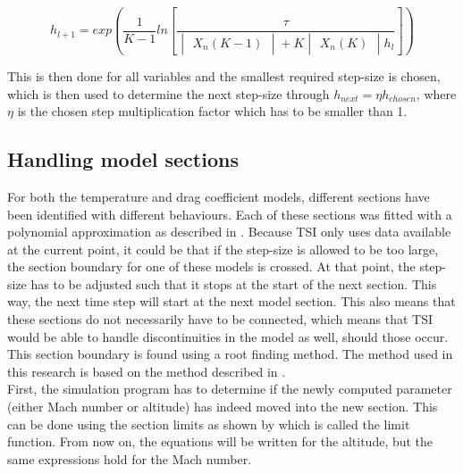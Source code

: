 \begin{equation} \label{eq:fix_point_it}
h_{l+1}=exp\left(\dfrac{1}{K-1}ln\left[\dfrac{\tau}{\begin{vmatrix}
X_{n}\left(K-1\right)
\end{vmatrix}+K\begin{vmatrix}
X_{n}\left(K\right)
\end{vmatrix}h_{l}}\right]\right)
\end{equation}

This is then done for all variables and the smallest required step-size is chosen, which is then used to determine the next step-size through $h_{next}=\eta h_{chosen}$, where $\eta$ is the chosen step multiplication factor which has to be smaller than 1. 


\subsection{Handling model sections}
\label{subsec:handlingModelSections}
For both the temperature and drag coefficient models, different sections have been identified with different behaviours. Each of these sections was fitted with a polynomial approximation as described in . Because \ac{TSI} only uses data available at the current point, it could be that if the step-size is allowed to be too large, the section boundary for one of these models is crossed. At that point, the step-size has to be adjusted such that it stops at the start of the next section. This way, the next time step will start at the next model section. This also means that these sections do not necessarily have to be connected, which means that \ac{TSI} would be able to handle discontinuities in the model as well, should those occur. \\
This section boundary is found using a root finding method. The method used in this research is based on the method described in \cite{bergsma2015application}. \\

\noindent
First, the simulation program has to determine if the newly computed parameter (either Mach number or altitude) has indeed moved into the new section. This can be done using the section limits as shown by  which is called the limit function. From now on, the equations will be written for the altitude, but the same expressions hold for the Mach number.

